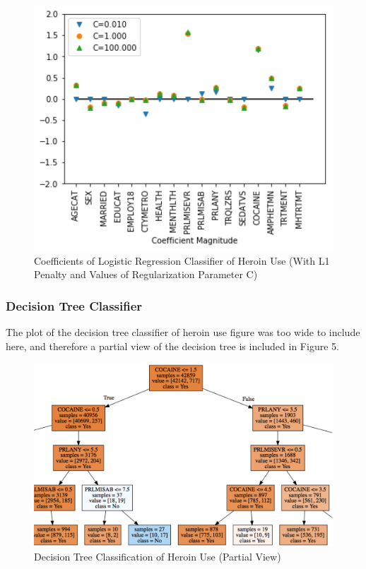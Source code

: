 \documentclass[sigconf]{acmart}
\begin{document}
\begin{figure}[!ht]
  \centering\includegraphics[width=\columnwidth]{images/Figure4.pdf}
  \caption{Coefficients of Logistic Regression Classifier of Heroin Use 
  (With L1 Penalty and Values of Regularization Parameter C)}
  \label{f:Figure4}
\end{figure}

\cite{raschka17}

\subsubsection{Decision Tree Classifier}

The plot of the decision tree classifier of heroin use figure was too wide
to include here, and therefore a partial view of the decision tree is included
in Figure 5.

\begin{figure}[!ht]
  \centering\includegraphics[width=\columnwidth]{images/Figure5.pdf}
  \caption{Decision Tree Classification of Heroin Use (Partial View)}
  \label{f:Figure5}
\end{figure}
\end{document}
